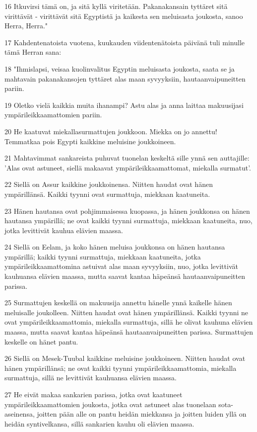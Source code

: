 \par 16 Itkuvirsi tämä on, ja sitä kyllä viritetään. Pakanakansain tyttäret sitä virittävät - virittävät sitä Egyptistä ja kaikesta sen meluisasta joukosta, sanoo Herra, Herra."
\par 17 Kahdentenatoista vuotena, kuukauden viidentenätoista päivänä tuli minulle tämä Herran sana:
\par 18 "Ihmislapsi, veisaa kuolinvalitus Egyptin meluisasta joukosta, saata se ja mahtavain pakanakansojen tyttäret alas maan syvyyksiin, hautaanvaipuneitten pariin.
\par 19 Oletko vielä kaikkia muita ihanampi? Astu alas ja anna laittaa makuusijasi ympärileikkaamattomien pariin.
\par 20 He kaatuvat miekallasurmattujen joukkoon. Miekka on jo annettu! Temmatkaa pois Egypti kaikkine meluisine joukkoineen.
\par 21 Mahtavimmat sankareista puhuvat tuonelan keskeltä sille ynnä sen auttajille: 'Alas ovat astuneet, siellä makaavat ympärileikkaamattomat, miekalla surmatut'.
\par 22 Siellä on Assur kaikkine joukkoinensa. Niitten haudat ovat hänen ympärillänsä. Kaikki tyynni ovat surmattuja, miekkaan kaatuneita.
\par 23 Hänen hautansa ovat pohjimmaisessa kuopassa, ja hänen joukkonsa on hänen hautansa ympärillä; ne ovat kaikki tyynni surmattuja, miekkaan kaatuneita, nuo, jotka levittivät kauhua elävien maassa.
\par 24 Siellä on Eelam, ja koko hänen meluisa joukkonsa on hänen hautansa ympärillä; kaikki tyynni surmattuja, miekkaan kaatuneita, jotka ympärileikkaamattomina astuivat alas maan syvyyksiin, nuo, jotka levittivät kauhuansa elävien maassa, mutta saavat kantaa häpeänsä hautaanvaipuneitten parissa.
\par 25 Surmattujen keskellä on makuusija annettu hänelle ynnä kaikelle hänen meluisalle joukolleen. Niitten haudat ovat hänen ympärillänsä. Kaikki tyynni ne ovat ympärileikkaamattomia, miekalla surmattuja, sillä he olivat kauhuna elävien maassa, mutta saavat kantaa häpeänsä hautaanvaipuneitten parissa. Surmattujen keskelle on hänet pantu.
\par 26 Siellä on Mesek-Tuubal kaikkine meluisine joukkoineen. Niitten haudat ovat hänen ympärillänsä; ne ovat kaikki tyynni ympärileikkaamattomia, miekalla surmattuja, sillä ne levittivät kauhuansa elävien maassa.
\par 27 He eivät makaa sankarien parissa, jotka ovat kaatuneet ympärileikkaamattomien joukosta, jotka ovat astuneet alas tuonelaan sota-aseinensa, joitten pään alle on pantu heidän miekkansa ja joitten luiden yllä on heidän syntivelkansa, sillä sankarien kauhu oli elävien maassa.
